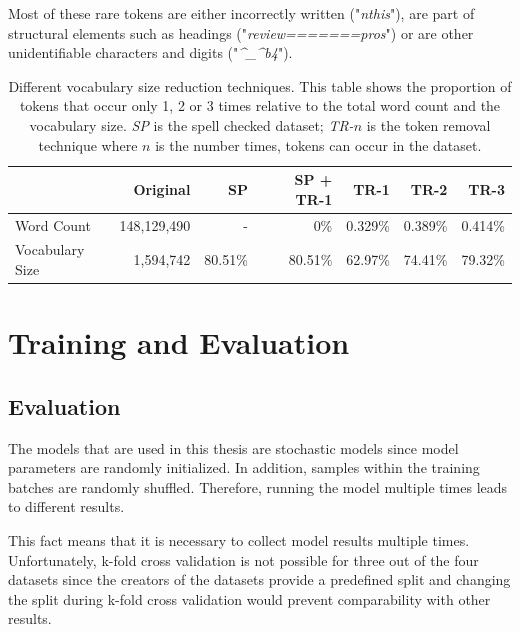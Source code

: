 Most of these rare tokens are either incorrectly written {("\textit{nthis}")}, are part of structural elements such as headings {("\textit{review=======pros}")} or are other unidentifiable characters and digits ({"\textit{\^{}\_\^{}b4}"}).

\begin{table}[]
    \centering
    \begin{tabular}{lrrrrrr}
            \toprule
                            & Original      & SP & SP + TR-1 & TR-1 & TR-2 & TR-3 \\
            \midrule
            Word Count      &148,129,490     & -              & 0\%           & 0.329\%         & 0.389\%         & 0.414\%            \\
            Vocabulary Size & 1,594,742       & 80.51\%        & 80.51\%          & 62.97\%         & 74.41\%         & 79.32\%      \\  
            \bottomrule     
    \end{tabular}

    \caption{Different vocabulary size reduction techniques. This table shows the proportion of tokens that occur only 1, 2 or 3 times relative to the total word count and the vocabulary size. \textit{SP} is the spell checked dataset; \textit{TR-}$n$ is the token removal technique where $n$ is the number times, tokens can occur in the dataset.}
    \label{tab:05_amazonVocabSize}
\end{table}

\section{Training and Evaluation}
\label{sec:05_TrainingAndEvaluation}

\subsection{Evaluation}

The models that are used in this thesis are stochastic models since model parameters are randomly initialized. In addition, samples within the training batches are randomly shuffled. Therefore, running the model multiple times leads to different results.
\medskip

This fact means that it is necessary to collect model results multiple times. Unfortunately, k-fold cross validation is not possible for three out of the four datasets since the creators of the datasets provide a predefined split and changing the split during k-fold cross validation would prevent comparability with other results.

